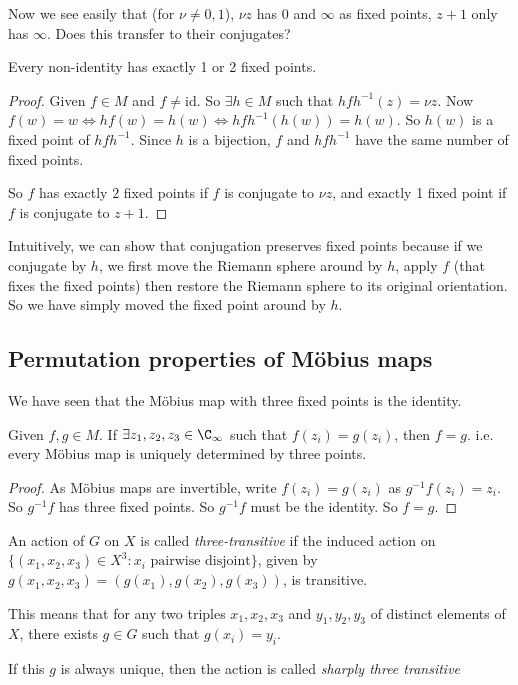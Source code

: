 \documentclass[a4paper]{article}
\begin{document}
  Now we see easily that (for $\nu \not= 0, 1$), $\nu z$ has $0$ and $\infty$ as fixed points, $z + 1$ only has $\infty$. Does this transfer to their conjugates?

  \begin{prop}
    Every non-identity has exactly 1 or 2 fixed points. 
  \end{prop}

  \begin{proof}
    Given $f\in M$ and $f\not= \mathrm{id}$. So $\exists h\in M$ such that $hfh^{-1}(z) = \nu{z}$. Now $f(w) = w \Leftrightarrow hf(w) = h(w) \Leftrightarrow hfh^{-1}(h(w)) = h(w)$. So $h(w)$ is a fixed point of $hfh^{-1}$. Since $h$ is a bijection, $f$ and $hfh^{-1}$ have the same number of fixed points.

    So $f$ has exactly $2$ fixed points if $f$ is conjugate to $\nu z$, and exactly 1 fixed point if $f$ is conjugate to $z + 1$.
  \end{proof}
  Intuitively, we can show that conjugation preserves fixed points because if we conjugate by $h$, we first move the Riemann sphere around by $h$, apply $f$ (that fixes the fixed points) then restore the Riemann sphere to its original orientation. So we have simply moved the fixed point around by $h$.

  \subsection{Permutation properties of M\"obius maps}
  We have seen that the M\"obius map with three fixed points is the identity.

  \begin{prop}
    Given $f, g\in M$. If $\exists z_1, z_2, z_3\in \C_{\infty}$ such that $f(z_i) = g(z_i)$, then $f = g$. i.e. every M\"obius map is uniquely determined by three points. 
  \end{prop}

  \begin{proof}
    As M\"obius maps are invertible, write $f(z_i) = g(z_i)$ as $g^{-1}f(z_i) = z_i$. So $g^{-1}f$ has three fixed points. So $g^{-1}f$ must be the identity. So $f = g$.
  \end{proof}

  \begin{defi}
    An action of $G$ on $X$ is called \emph{three-transitive} if the induced action on $\{(x_1, x_2, x_3)\in X^3: x_i\text{ pairwise disjoint}\}$, given by $g(x_1, x_2, x_3) = (g(x_1), g(x_2), g(x_3))$, is transitive.

    This means that for any two triples $x_1, x_2, x_3$ and $y_1, y_2, y_3$ of distinct elements of $X$, there exists $g\in G$ such that $g(x_i) = y_i$.

    If this $g$ is always unique, then the action is called \emph{sharply three transitive}
  \end{defi}
\end{document}
